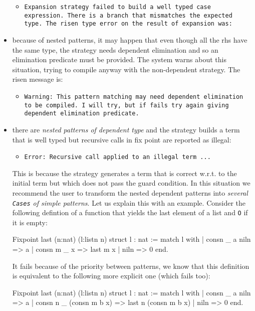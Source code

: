\begin{itemize}
  \begin{itemize}
  \item 
  {\tt Expansion strategy failed to build a well typed case expression.
  There is a branch that mismatches the expected type.
  The risen type error on the result of expansion was:}
  \end{itemize}

\item because of nested patterns, it may happen that even  though all
the rhs have  the same type, the strategy needs
dependent elimination and so an elimination predicate must be
provided. The system
warns about this situation, trying to compile anyway with the
non-dependent strategy. The risen message is:
\begin{itemize}
\item {\tt Warning: This pattern matching may need dependent elimination to be compiled.
I will try, but if fails try again giving dependent elimination predicate.}
\end{itemize}

\item there are {\em nested patterns of dependent type} and the strategy
builds a term that is well typed but recursive
calls in fix point are reported as illegal:
\begin{itemize}
\item {\tt Error: Recursive call applied to an illegal term ...}
\end{itemize}

This is because the strategy generates a term that is correct
w.r.t. to the initial term but which does  not pass the guard condition.
In this situation we recommend the user to transform the nested  dependent
patterns into {\em several \verb+Cases+ of simple patterns}.
Let us explain this with an example.
Consider the following defintion of a function that yields the last
element of a list and \verb+O+ if it is empty:

\begin{coq_example}
Fixpoint last (n:nat) (l:listn n) {struct l} : nat :=
  match l with
  | consn _ a niln => a
  | consn m _ x => last m x
  | niln => 0%
  end.
\end{coq_example}

It fails because of the priority between patterns, we know that this
definition is equivalent to the following more explicit one (which
fails too):

\begin{coq_example*}
Fixpoint last (n:nat) (l:listn n) {struct l} : nat :=
  match l with
  | consn _ a niln => a
  | consn n _ (consn m b x) => last n (consn m b x)
  | niln => 0%
  end.
\end{coq_example*}


\end{itemize}
